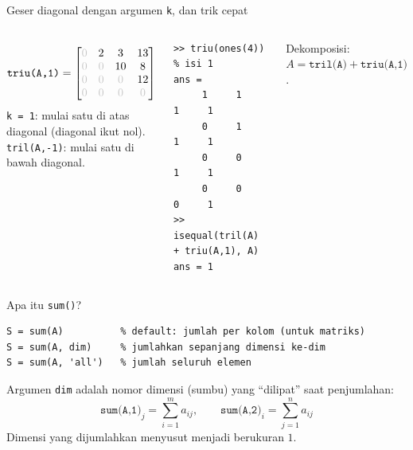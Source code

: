 \documentclass[aspectratio=169,11pt]{beamer}
\newcommand{\z}{\textcolor{gray!45}{0}}
\begin{document}
\begin{frame}[fragile]{Geser diagonal dengan argumen \texttt{k}, dan trik cepat}
\begin{columns}[T]
\centering
\[
\texttt{triu(A,1)} =
\begin{bmatrix}
\z & 2 & 3 & 13\\
\z & \z & 10 & 8\\
\z & \z & \z & 12\\
\z & \z & \z & \z
\end{bmatrix}
\]
\small \texttt{k = 1}: mulai satu di atas diagonal (diagonal ikut nol).\\
\texttt{tril(A,-1)}: mulai satu di bawah diagonal.
\begin{lstlisting}[basicstyle=\ttfamily\footnotesize]
>> triu(ones(4))  % isi 1
ans =
     1     1     1     1
     0     1     1     1
     0     0     1     1
     0     0     0     1
>> isequal(tril(A) + triu(A,1), A)
ans = 1
\end{lstlisting}
\small Dekomposisi: $A = \texttt{tril(A)} + \texttt{triu(A,1)}$.
\end{columns}
\end{frame}

\begin{frame}[fragile]{Apa itu \texttt{sum()}?}
\begin{lstlisting}
S = sum(A)          % default: jumlah per kolom (untuk matriks)
S = sum(A, dim)     % jumlahkan sepanjang dimensi ke-dim
S = sum(A, 'all')   % jumlah seluruh elemen
\end{lstlisting}
\vspace{0.4em}
Argumen \texttt{dim} adalah \alert{nomor dimensi (sumbu)} yang
``dilipat'' saat penjumlahan:
\[
  \texttt{sum(A,1)}_j = \sum_{i=1}^{m} a_{ij},
  \qquad
  \texttt{sum(A,2)}_i = \sum_{j=1}^{n} a_{ij}
\]
Dimensi yang dijumlahkan menyusut menjadi berukuran $1$.
\end{frame}
\end{document}
